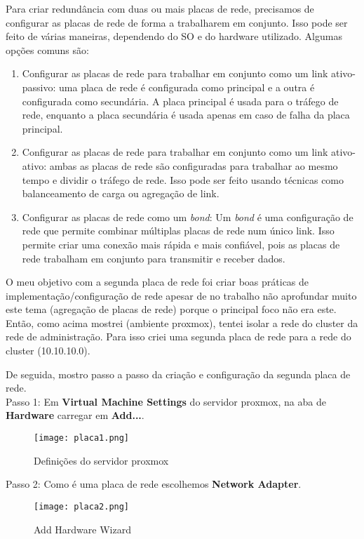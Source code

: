 Para criar redundância com duas ou mais placas de rede, precisamos de configurar as placas de rede de forma a trabalharem em conjunto. Isso pode ser feito de várias maneiras, dependendo do \ac{SO} e do hardware utilizado. Algumas opções comuns são:

\begin{enumerate}
    \item Configurar as placas de rede para trabalhar em conjunto como um link ativo-passivo: uma placa de rede é configurada como principal e a outra é configurada como secundária. A placa principal é usada para o tráfego de rede, enquanto a placa secundária é usada apenas em caso de falha da placa principal.
    \item Configurar as placas de rede para trabalhar em conjunto como um link ativo-ativo: ambas as placas de rede são configuradas para trabalhar ao mesmo tempo e dividir o tráfego de rede. Isso pode ser feito usando técnicas como balanceamento de carga ou agregação de link.
    \item Configurar as placas de rede como um \textit{bond}: Um \textit{bond} é uma configuração de rede que permite combinar múltiplas placas de rede num único link. Isso permite criar uma conexão mais rápida e mais confiável, pois as placas de rede trabalham em conjunto para transmitir e receber dados.
\end{enumerate}

O meu objetivo com a segunda placa de rede foi criar boas práticas de implementação/configuração de rede apesar de no trabalho não aprofundar muito este tema (agregação de placas de rede) porque o principal foco não era este. Então, como acima mostrei (ambiente proxmox), tentei isolar a rede do cluster da rede de administração. Para isso criei uma segunda placa de rede para a rede do cluster (10.10.10.0).

\newpage
De seguida, mostro passo a passo da criação e configuração da segunda placa de rede.\\

Passo 1: Em \textbf{Virtual Machine Settings} do servidor proxmox, na aba de \textbf{Hardware} carregar em \textbf{Add...}.
\begin{figure}[H]
\center
\texttt{[image: placa1.png]}
\caption{Definições do servidor proxmox}
\end{figure}

\newpage
Passo 2: Como é uma placa de rede escolhemos \textbf{Network Adapter}.
\begin{figure}[H]
\center
\texttt{[image: placa2.png]}
\caption{Add Hardware Wizard}
\end{figure}

